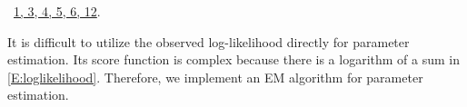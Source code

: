 \documentclass[reqno]{amsart}
\renewcommand{\NWlink}[2]{\hyperlink{#1}{#2}}
\begin{document}
\begin{flushleft}
\begin{list}{}{}
\mbox{}\verb@    probs <- spglm_probs(beta, f0, data_object, link)@\\
\mbox{}\verb@    llik <- log(probs) %*% data_object$weights@\\
\mbox{}\verb@    c(llik)@\\
\mbox{}\verb@}@\\
\mbox{}\verb@@{\NWsep}
\end{list}
\vspace{-1.5ex}
\footnotesize
\begin{list}{}{\setlength{\itemsep}{-\parsep}\setlength{\itemindent}{-\leftmargin}}
\item \NWtxtFileDefBy\ \NWlink{nuweb1}{1}\NWlink{nuweb3}{, 3}\NWlink{nuweb4}{, 4}\NWlink{nuweb5}{, 5}\NWlink{nuweb6}{, 6}\NWlink{nuweb12}{, 12}.

\item{}
\end{list}
\vspace{4ex}
\end{flushleft}
It is difficult to utilize the observed log-likelihood directly for parameter estimation. Its score function is complex because there is a logarithm of a sum in \eqref{E:loglikelihood}. Therefore, we implement an EM algorithm for parameter estimation.
\end{document}
